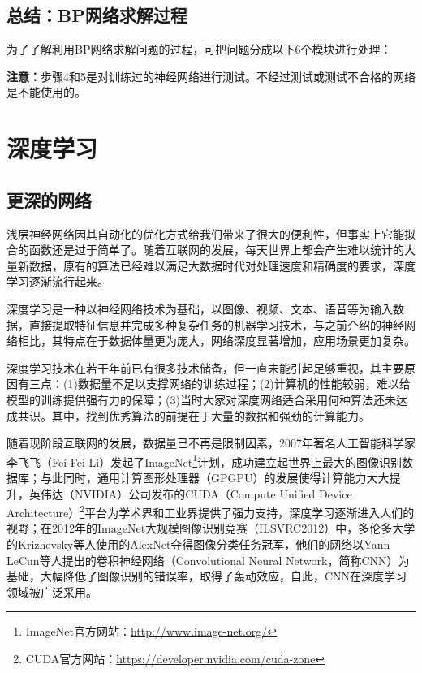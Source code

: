 \documentclass[bwprint]{cumcmthesis}
\begin{document}
\subsection{总结：BP网络求解过程}

为了了解利用BP网络求解问题的过程，可把问题分成以下6个模块进行处理：
\begin{center}
\end{center}

\textbf{注意：}步骤4和5是对训练过的神经网络进行测试。不经过测试或测试不合格的网络是不能使用的。


\section{深度学习}



\subsection{更深的网络}

浅层神经网络因其自动化的优化方式给我们带来了很大的便利性，但事实上它能拟合的函数还是过于简单了。随着互联网的发展，每天世界上都会产生难以统计的大量新数据，原有的算法已经难以满足大数据时代对处理速度和精确度的要求，深度学习逐渐流行起来。

深度学习是一种以神经网络技术为基础，以图像、视频、文本、语音等为输入数据，直接提取特征信息并完成多种复杂任务的机器学习技术，与之前介绍的神经网络相比，其特点在于数据体量更为庞大，网络深度显著增加，应用场景更加复杂。

深度学习技术在若干年前已有很多技术储备，但一直未能引起足够重视，其主要原因有三点：(1)数据量不足以支撑网络的训练过程；(2)计算机的性能较弱，难以给模型的训练提供强有力的保障；(3)当时大家对深度网络适合采用何种算法还未达成共识。其中，找到优秀算法的前提在于大量的数据和强劲的计算能力。

随着现阶段互联网的发展，数据量已不再是限制因素，2007年著名人工智能科学家李飞飞（Fei-Fei Li）发起了ImageNet\footnote{ImageNet官方网站：\url{http://www.image-net.org/}}计划，成功建立起世界上最大的图像识别数据库\cite{LiFeiFei2009CVPR}；与此同时，通用计算图形处理器（GPGPU）的发展使得计算能力大大提升，英伟达（NVIDIA）公司发布的CUDA（Compute Unified Device Architecture）\footnote{CUDA官方网站：\url{https://developer.nvidia.com/cuda-zone}}平台为学术界和工业界提供了强力支持，深度学习逐渐进入人们的视野；在2012年的ImageNet大规模图像识别竞赛（ILSVRC2012）中，多伦多大学的Krizhevsky等人使用的AlexNet\cite{Alex2012NIPS}夺得图像分类任务冠军，他们的网络以Yann LeCun等人提出的卷积神经网络（Convolutional Neural Network，简称CNN）\cite{lecun1990CNN}为基础，大幅降低了图像识别的错误率，取得了轰动效应，自此，CNN在深度学习领域被广泛采用。
\end{document}
